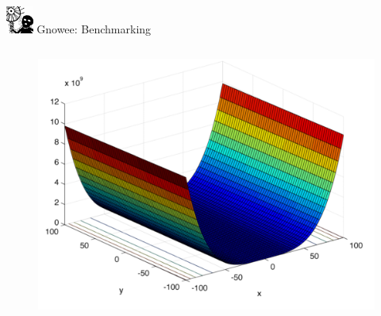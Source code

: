 \documentclass[xcolor=x11names,compress]{beamer}
\renewcommand{\(}{\begin{columns}}
\renewcommand{\)}{\end{columns}}
\newcommand{\<}[1]{\begin{column}{#1}}
\renewcommand{\>}{\end{column}}
\begin{document}
\begin{frame}{\includegraphics[width=0.35in]{../figs/Gnowee.png} Gnowee: Benchmarking \cite{Walton2013a,Yang2014,Civicioglu2013}}
\begin{columns}
\begin{column}{0.33\linewidth}
\begin{figure}[htp]
        \vspace{-0.35cm}
      \end{figure}       
      \vspace{-1.15cm} 
      \begin{figure}[htp]
        \centering
        \includegraphics[width=1.0\textwidth, height=0.25\textheight]{../figs/Rosenbrock.png} 
        \vspace{-0.35cm}
      \end{figure}
    \end{column}
  \end{columns}
\end{frame}
\end{document}
